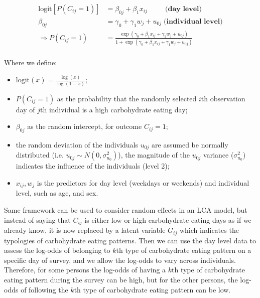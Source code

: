 \begin{equation}
\begin{aligned}
\text{logit}[P(C_{ij} = 1)] & = \beta_{0j} + \beta_{1}x_{ij} \;\;\;\;\;\;\;\;\; \textbf{(day level)}  \\
\beta_{0j} & = \gamma_0 + \gamma_1 w_j + u_{0j} \; \textbf{(individual level)} \\ 
\Rightarrow P(C_{ij} = 1) & = \frac{\exp{(\gamma_0 + \beta_{1}x_{ij} + \gamma_1 w_j + u_{0j})}}{1 + \exp{(\gamma_0 + \beta_{1}x_{ij} + \gamma_1 w_j + u_{0j})}} \\
\end{aligned}
\label{randomLCA}
\end{equation}
\vspace{-0.3cm}

Where we define: 

\begin{itemize}
	\item $\text{logit}{(x)} = \frac{\log(x)}{\log(1-x)}$;
	\item $P(C_{ij} = 1)$ as the probability that the randomly selected $i$th observation day of $j$th individual is a high carbohydrate eating day;
	\item $\beta_{0j}$ as the random intercept, for outcome $C_{ij} = 1$; 
	\item the random deviation of the individuals $u_{0j}$ are assumed be normally distributed (i.e. $u_{0j} \sim N(0, \sigma_{u_0}^2)$), the magnitude of the $u_{0j}$ variance ($\sigma_{u_0}^2$) indicates the influence of the individuals (level 2);
	\item $x_{ij}, w_j$ is the predictors for day level (weekdays or weekends) and individual level, such as age, and sex.
\end{itemize}



Same framework can be used to consider random effects in an LCA model, but instead of saying that $C_{ij}$ is either low or high carbohydrate eating days as if we already know, it is now replaced by a latent variable $G_{ij}$ which indicates the typologies of carbohydrate eating patterns. Then we can use the day level data to assess the log-odds of belonging to $k$th type of carbohydrate eating pattern on a specific day of survey, and we allow the log-odds to vary across individuals. Therefore, for some persons the log-odds of having a $k$th type of carbohydrate eating pattern during the survey can be high, but for the other persons, the log-odds of following the $k$th type of carbohydrate eating pattern can be low. 

